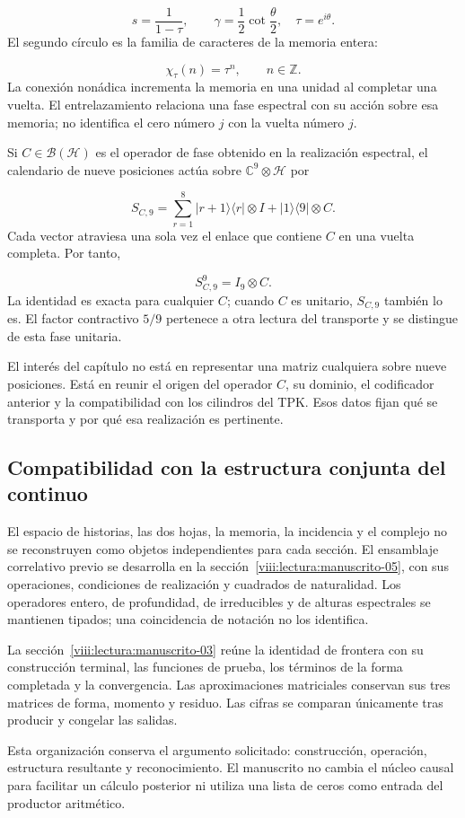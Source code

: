 \[
s=\frac1{1-\tau},\qquad
\gamma=\frac12\cot\frac{\theta}{2},\quad\tau=e^{i\theta}.
\]
El segundo círculo es la familia de caracteres de la memoria entera:

\[
\chi_\tau(n)=\tau^n,\qquad n\in\mathbb Z.
\]
La conexión nonádica incrementa la memoria en una unidad al completar una vuelta. El entrelazamiento relaciona una fase espectral con su acción sobre esa memoria; no identifica el cero número $j$ con la vuelta número $j$.

Si \(C\in\mathcal B(\mathcal H)\) es el operador de fase obtenido en la realización espectral, el calendario de nueve posiciones actúa sobre \(\mathbb C^9\otimes\mathcal H\) por

\[
S_{C,9}=\sum_{r=1}^8|r+1\rangle\langle r|\otimes I
+|1\rangle\langle9|\otimes C.
\]
Cada vector atraviesa una sola vez el enlace que contiene $C$ en una vuelta completa. Por tanto,

\[
S_{C,9}^9=I_9\otimes C.
\]
La identidad es exacta para cualquier $C$; cuando $C$ es unitario, $S_{C,9}$ también lo es. El factor contractivo $5/9$ pertenece a otra lectura del transporte y se distingue de esta fase unitaria.

El interés del capítulo no está en representar una matriz cualquiera sobre nueve posiciones. Está en reunir el origen del operador $C$, su dominio, el codificador anterior y la compatibilidad con los cilindros del TPK. Esos datos fijan qué se transporta y por qué esa realización es pertinente.

\clearpage
\subsection{Compatibilidad con la estructura conjunta del continuo}
El espacio de historias, las dos hojas, la memoria, la incidencia y el complejo no se reconstruyen como objetos independientes para cada sección. El ensamblaje correlativo previo se desarrolla en la sección~\ref{viii:lectura:manuscrito-05}, con sus operaciones, condiciones de realización y cuadrados de naturalidad. Los operadores entero, de profundidad, de irreducibles y de alturas espectrales se mantienen tipados; una coincidencia de notación no los identifica.

La sección~\ref{viii:lectura:manuscrito-03} reúne la identidad de frontera con su construcción terminal, las funciones de prueba, los términos de la forma completada y la convergencia. Las aproximaciones matriciales conservan sus tres matrices de forma, momento y residuo. Las cifras se comparan únicamente tras producir y congelar las salidas.

Esta organización conserva el argumento solicitado: construcción, operación, estructura resultante y reconocimiento. El manuscrito no cambia el núcleo causal para facilitar un cálculo posterior ni utiliza una lista de ceros como entrada del productor aritmético.
